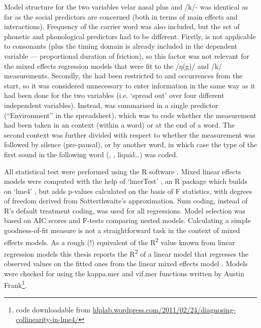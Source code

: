 Model structure for the two  variables velar nasal plus and /k/- was identical as far as the social predictors are concerned (both in terms of main effects and interactions).
Frequency of the carrier word was also included, but the set of phonetic and phonological predictors had to be different.
Firstly,  is not applicable to consonants (plus the timing domain is already included in the dependent variable --- proportional duration of friction), so this factor was not relevant for the mixed effects regression models that were fit to the /ŋ(g)/ and /k/ measurements.
Secondly, the  had been restricted to  and  occurrences from the start, so it was considered unnecessary to enter information in the same way as it had been done for the two  variables (i.e. `spread out' over four different independent variables).
Instead,  was summarised in a single predictor (``Environment'' in the spreadsheet), which was to code whether the measurement had been taken in an  context (within a word) or at the end of a word.
The second context was further divided with respect to whether the measurement was followed by silence (pre-pausal), or by another word, in which case the type of the first sound in the following word (, , liquid\ldots) was coded.

All statistical test were performed using the R software \parencite{R}.
Mixed linear effects models were computed with the help of `lmerTest' \parencite{lmerTest}, an R package which builds on `lme4' \parencite{lme4}, but adds p-values calculated on the basis of F statistics, with degrees of freedom derived from Satterthwaite's approximation.
Sum coding, instead of R's default treatment coding, was used for all regressions.
Model selection was based on AIC scores and F-tests comparing nested models.
Calculating a simple goodness-of-fit measure is not a straightforward task in the context of mixed effects models.
As a rough (!) equivalent of the R\textsuperscript{2} value known from linear regression models this thesis reports the R\textsuperscript{2} of a linear model that regresses the observed values on the fitted ones from the linear mixed effects model \parencite[cf.][]{glmwiki}.
Models were checked for  using the kappa.mer and vif.mer
functions written by Austin Frank\footnote{code downloadable from \url{hlplab.wordpress.com/2011/02/24/diagnosing-collinearity-in-lme4/}}.